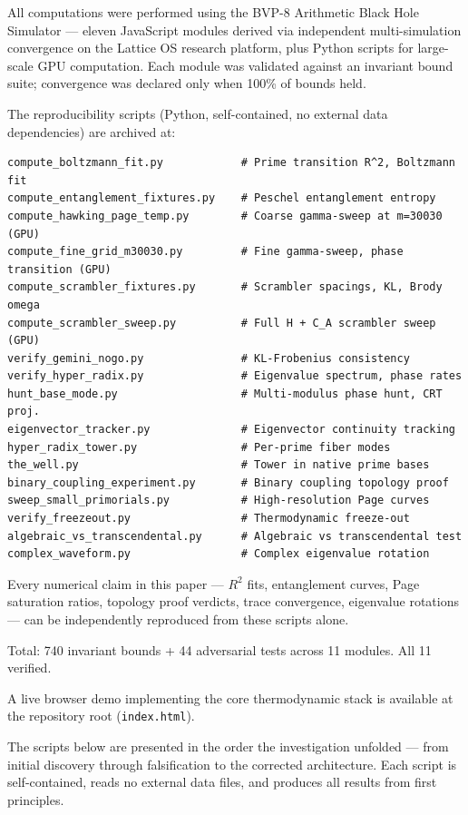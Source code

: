 \documentclass[
  11pt,
]{article}
\numberwithin{equation}{section}
\begin{document}
All computations were performed using the BVP-8 Arithmetic Black Hole
Simulator --- eleven JavaScript modules derived via independent
multi-simulation convergence on the Lattice OS research platform, plus
Python scripts for large-scale GPU computation. Each module was
validated against an invariant bound suite; convergence was declared
only when 100\% of bounds held.

The reproducibility scripts (Python, self-contained, no external data
dependencies) are archived at:

{\small
\begin{verbatim}
compute_boltzmann_fit.py            # Prime transition R^2, Boltzmann fit
compute_entanglement_fixtures.py    # Peschel entanglement entropy
compute_hawking_page_temp.py        # Coarse gamma-sweep at m=30030 (GPU)
compute_fine_grid_m30030.py         # Fine gamma-sweep, phase transition (GPU)
compute_scrambler_fixtures.py       # Scrambler spacings, KL, Brody omega
compute_scrambler_sweep.py          # Full H + C_A scrambler sweep (GPU)
verify_gemini_nogo.py               # KL-Frobenius consistency
verify_hyper_radix.py               # Eigenvalue spectrum, phase rates
hunt_base_mode.py                   # Multi-modulus phase hunt, CRT proj.
eigenvector_tracker.py              # Eigenvector continuity tracking
hyper_radix_tower.py                # Per-prime fiber modes
the_well.py                         # Tower in native prime bases
binary_coupling_experiment.py       # Binary coupling topology proof
sweep_small_primorials.py           # High-resolution Page curves
verify_freezeout.py                 # Thermodynamic freeze-out
algebraic_vs_transcendental.py      # Algebraic vs transcendental test
complex_waveform.py                 # Complex eigenvalue rotation
\end{verbatim}
}

Every numerical claim in this paper --- \(R^2\) fits, entanglement
curves, Page saturation ratios, topology proof verdicts, trace
convergence, eigenvalue rotations --- can be independently reproduced
from these scripts alone.

Total: 740 invariant bounds + 44 adversarial tests across 11 modules.
All 11 verified.

A live browser demo implementing the core thermodynamic stack is
available at the repository root (\texttt{index.html}).

The scripts below are presented in the order the investigation unfolded
--- from initial discovery through falsification to the corrected
architecture. Each script is self-contained, reads no external data
files, and produces all results from first principles.
\end{document}
